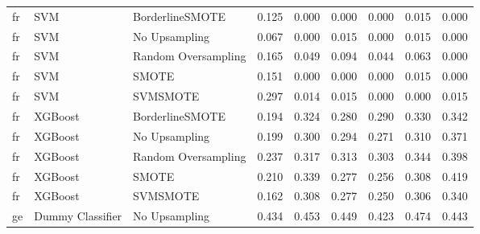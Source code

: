 \begin{tabular}{lllllllll}
      fr &                          SVM &     BorderlineSMOTE & 0.125 &                     0.000 &                 0.000 &                  0.000 &                                   0.015 &     0.000 \\
      fr &                          SVM &       No Upsampling & 0.067 &                     0.000 &                 0.015 &                  0.000 &                                   0.015 &     0.000 \\
      fr &                          SVM & Random Oversampling & 0.165 &                     0.049 &                 0.094 &                  0.044 &                                   0.063 &     0.000 \\
      fr &                          SVM &               SMOTE & 0.151 &                     0.000 &                 0.000 &                  0.000 &                                   0.015 &     0.000 \\
      fr &                          SVM &            SVMSMOTE & 0.297 &                     0.014 &                 0.015 &                  0.000 &                                   0.000 &     0.015 \\
      fr &                      XGBoost &     BorderlineSMOTE & 0.194 &                     0.324 &                 0.280 &                  0.290 &                                   0.330 &     0.342 \\
      fr &                      XGBoost &       No Upsampling & 0.199 &                     0.300 &                 0.294 &                  0.271 &                                   0.310 &     0.371 \\
      fr &                      XGBoost & Random Oversampling & 0.237 &                     0.317 &                 0.313 &                  0.303 &                                   0.344 &     0.398 \\
      fr &                      XGBoost &               SMOTE & 0.210 &                     0.339 &                 0.277 &                  0.256 &                                   0.308 &     0.419 \\
      fr &                      XGBoost &            SVMSMOTE & 0.162 &                     0.308 &                 0.277 &                  0.250 &                                   0.306 &     0.340 \\
      ge &             Dummy Classifier &       No Upsampling & 0.434 &                     0.453 &                 0.449 &                  0.423 &                                   0.474 &     0.443 \\

\end{tabular}
